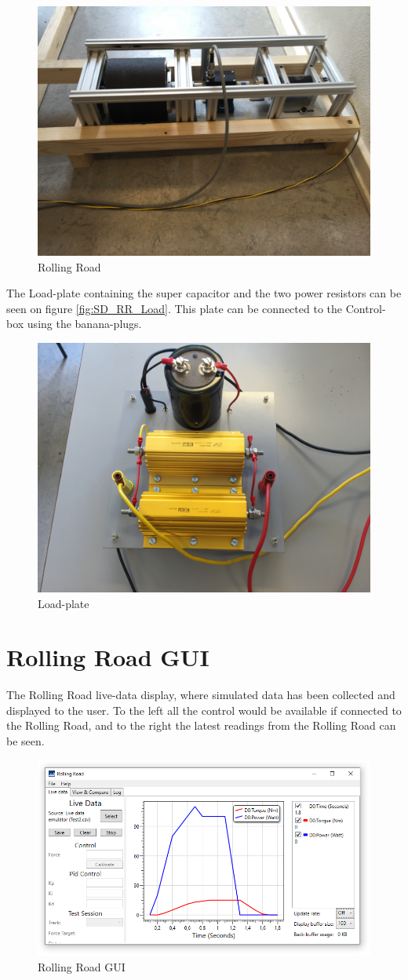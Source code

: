 \begin{figure}[H]
	\centering
	\includegraphics[width=0.7\linewidth]{SubPages/Images/SS_RR_Roal}
	\caption{Rolling Road}
	\label{fig:SS_RR_Roal}
\end{figure}

The Load-plate containing the super capacitor and the two power resistors can be seen on figure \vref{fig:SD_RR_Load}. This plate can be connected to the Control-box using the banana-plugs.

\begin{figure}[H]
	\centering
	\includegraphics[width=0.7\linewidth]{SubPages/Images/SD_RR_Load}
	\caption{Load-plate}
	\label{fig:SD_RR_Load}
\end{figure}

\newpage
\section{Rolling Road GUI}
The Rolling Road live-data display, where simulated data has been collected and displayed to the user. To the left all the control would be available if connected to the Rolling Road, and to the right the latest readings from the Rolling Road can be seen.

\begin{figure}[H]
	\centering
	\includegraphics[width=0.9\linewidth]{SubPages/Images/SD_GUI}
	\caption{Rolling Road GUI}
	\label{fig:SD_GUI}
\end{figure}
